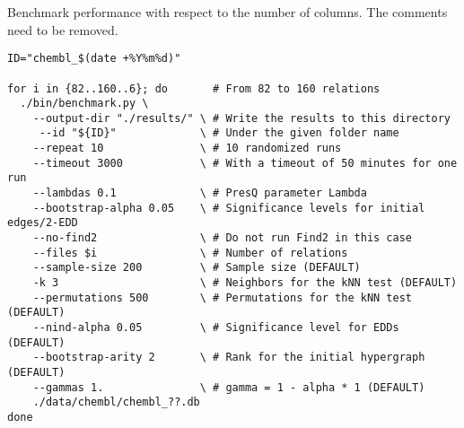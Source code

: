 \begin{code}
\caption[Benchmark performance with respect to the number of columns.]{
Benchmark performance with respect to the number of columns. The comments need to be removed.}\label{script:perf_columns}
\begin{verbatim}
ID="chembl_$(date +%Y%m%d)"

for i in {82..160..6}; do       # From 82 to 160 relations
  ./bin/benchmark.py \
    --output-dir "./results/" \ # Write the results to this directory
     --id "${ID}"             \ # Under the given folder name
    --repeat 10               \ # 10 randomized runs
    --timeout 3000            \ # With a timeout of 50 minutes for one run
    --lambdas 0.1             \ # PresQ parameter Lambda
    --bootstrap-alpha 0.05    \ # Significance levels for initial edges/2-EDD
    --no-find2                \ # Do not run Find2 in this case
    --files $i                \ # Number of relations
    --sample-size 200         \ # Sample size (DEFAULT)
    -k 3                      \ # Neighbors for the kNN test (DEFAULT)
    --permutations 500        \ # Permutations for the kNN test (DEFAULT)
    --nind-alpha 0.05         \ # Significance level for EDDs (DEFAULT)
    --bootstrap-arity 2       \ # Rank for the initial hypergraph (DEFAULT)
    --gammas 1.               \ # gamma = 1 - alpha * 1 (DEFAULT)
    ./data/chembl/chembl_??.db
done
\end{verbatim}
\end{code}
